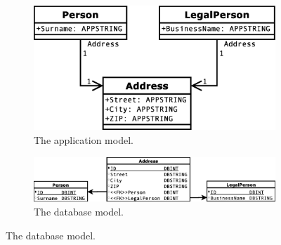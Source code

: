 \documentclass[11pt]{article}
\begin{document}
\begin{figure}
\begin{subfigure}[b]{0.5\textwidth}
	\includegraphics[width=\textwidth]{./images/case_app_9}
	\caption{The application model.}
\end{subfigure}
\begin{subfigure}[b]{0.5\textwidth}
	\includegraphics[width=\textwidth]{./images/case_db_8}
	\caption{The database model.}
\end{subfigure}


\end{figure}
\end{document}
